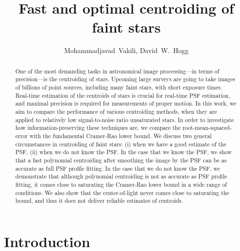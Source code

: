 \documentclass[12pt, preprint]{aastex}
\begin{document}
\author{
  Mohammadjavad~Vakili,
  David~W.~Hogg
}

\title{Fast and optimal centroiding of faint stars}

\begin{abstract}
One of the most demanding tasks in astronomical image processing---in terms of precision---is the centroiding of stars. 
Upcoming large surveys are going to take images of billions of point sources, 
including many faint stars, with short exposure times. Real-time estimation of the
centroids of stars is crucial for real-time PSF estimation, and maximal precision is required
for measurements of proper motion. In this work, we aim to compare the performance of
various centroiding methods, when they are applied
to relatively low signal-to-noise ratio unsaturated stars.
In order to investigate how information-preserving these techniques are, we compare
the root-mean-squared-error with the fundamental Cramer-Rao
lower bound. We discuss two general circumstances in centroiding of faint stars: (i) when we have a good estimate
of the PSF, (ii) when we do not know the PSF. In the case that we know the PSF, we show that a fast
 polynomial centroiding after smoothing the image by the PSF can be 
as accurate as full PSF profile fitting. In the case that we do not
know the PSF, we demonstrate that although polynomial centroiding is not as
accurate as PSF profile fitting, it comes close to saturating the Cramer-Rao lower bound
in a wide range of conditions. We also show that the center-of-light never comes close to 
saturating the bound, and thus it does not deliver reliable estimates of centroids.    

\end{abstract}

\section{Introduction}
\end{document}
